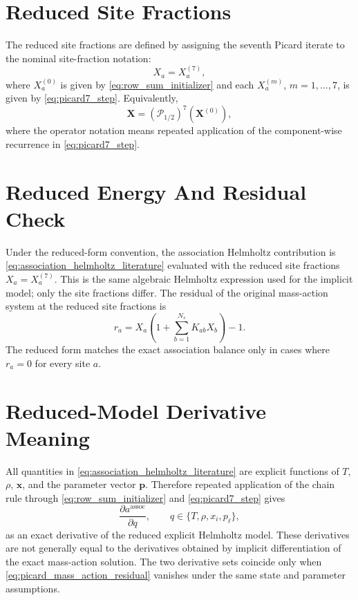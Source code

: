 \documentclass[12pt,letterpaper]{article}
\newcommand{\assoc}{\mathrm{assoc}}
\begin{document}
\section{Reduced Site Fractions}

The reduced site fractions are defined by assigning the seventh Picard iterate
to the nominal site-fraction notation:
\begin{equation}
    X_a = X_a^{(7)},
    \label{eq:final_picard_site_fraction}
\end{equation}
where \(X_a^{(0)}\) is given by \eqref{eq:row_sum_initializer} and each
\(X_a^{(m)}\), \(m=1,\dots,7\), is given by \eqref{eq:picard7_step}. Equivalently,
\begin{equation}
    \mathbf{X}
    =
    \left(\mathcal{P}_{1/2}\right)^7
    \left(\mathbf{X}^{(0)}\right),
    \label{eq:picard7_map}
\end{equation}
where the operator notation means repeated application of the component-wise
recurrence in \eqref{eq:picard7_step}.

\section{Reduced Energy And Residual Check}

Under the reduced-form convention, the association Helmholtz contribution is
\eqref{eq:association_helmholtz_literature} evaluated with the reduced site
fractions \(X_a=X_a^{(7)}\). This is the same algebraic Helmholtz expression
used for the implicit model; only the site fractions differ. The residual of
the original mass-action system at the reduced site fractions is
\begin{equation}
    r_a
    =
    X_a
    \left(
        1+\sum_{b=1}^{N_s}K_{ab}X_b
    \right)-1 .
    \label{eq:picard_mass_action_residual}
\end{equation}
The reduced form matches the exact association balance only in cases where
\(r_a=0\) for every site \(a\).

\section{Reduced-Model Derivative Meaning}

All quantities in \eqref{eq:association_helmholtz_literature} are explicit
functions of \(T\), \(\rho\), \(\mathbf{x}\), and the parameter vector
\(\mathbf{p}\). Therefore repeated application of the chain rule through
\eqref{eq:row_sum_initializer} and \eqref{eq:picard7_step} gives
\begin{equation}
    \frac{\partial a^\assoc}{\partial q},
    \qquad
    q\in\{T,\rho,x_i,p_\ell\},
    \label{eq:picard_derivative_contract}
\end{equation}
as an exact derivative of the reduced explicit Helmholtz model. These
derivatives are not generally equal to the derivatives obtained by implicit
differentiation of the exact mass-action solution. The two derivative sets
coincide only when \eqref{eq:picard_mass_action_residual} vanishes under the
same state and parameter assumptions.
\end{document}
